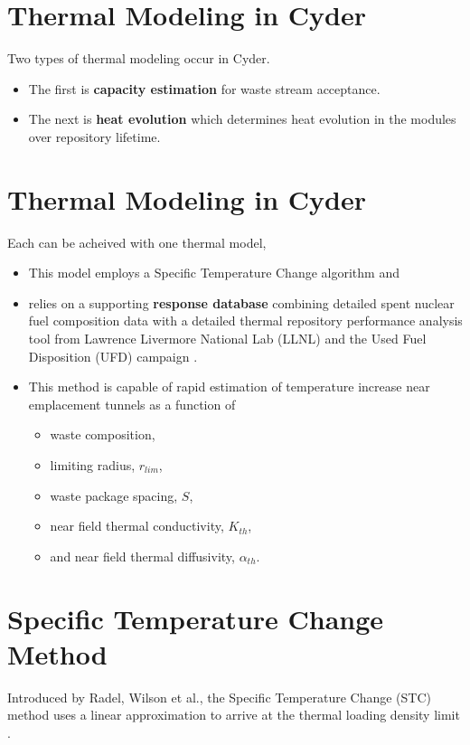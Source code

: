 \documentclass[letterpaper]{article}
\begin{document}
\section{Thermal Modeling in Cyder}
Two types of thermal modeling occur in Cyder. 
\begin{itemize}
\item The first is \textbf{capacity estimation} for waste stream acceptance.
\item The next is \textbf{heat evolution} which determines heat evolution in 
the modules over repository lifetime.
\end{itemize}

\section{Thermal Modeling in Cyder}
Each can be acheived with one thermal model,
\begin{itemize}
\item This model employs a Specific Temperature Change algorithm \cite{radel_effect_2007, radel_repository_2007} and
\item relies on a supporting \textbf{response database} combining detailed 
spent nuclear fuel composition data \cite{carter_fuel_2011} with a detailed 
thermal repository performance analysis tool from Lawrence Livermore National 
Lab (LLNL) and the Used Fuel Disposition (UFD) 
campaign \cite{greenberg_application_2012}.  
\item This method is capable of rapid estimation of temperature increase near emplacement tunnels as a function of 
\begin{itemize}
\item waste composition,
\item limiting radius, $r_{lim}$, 
\item waste package spacing, $S$, 
\item near field thermal conductivity, $K_{th}$, 
\item and near field thermal diffusivity, $\alpha_{th}$.
\end{itemize}
\end{itemize}

\section{Specific Temperature Change Method}
Introduced by Radel, Wilson et al., the Specific Temperature Change (STC) method uses 
a linear approximation to arrive at the thermal loading density limit 
\cite{radel_repository_2007, radel_effect_2007}.  
\end{document}
